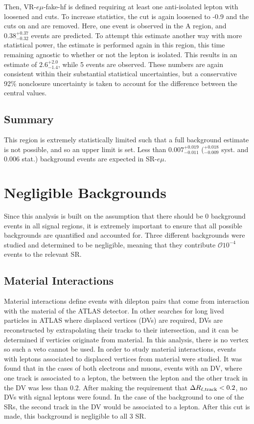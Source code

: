 Then, VR-$e\mu$-fake-hf is defined requiring at least one anti-isolated lepton with loosened \pt and \absdz cuts. To increase statistics, the \dpt cut is again loosened to -0.9 and the cuts on \nprecision and \nphi are removed. Here, one event is observed in the A region, and $0.38^{+0.37}_{-0.32}$ events are predicted. To attempt this estimate another way with more statistical power, the estimate is performed again in this region, this time remaining agnostic to whether or not the lepton is isolated. This results in an estimate of $2.6^{+2.0}_{-1.4}$, while 5 events are observed. These numbers are again consistent within their substantial statistical uncertainties, but a conservative 92\% nonclosure uncertainty is taken to account for the difference between the central values.

\subsection{Summary}
This region is extremely statistically limited such that a full background estimate is not possible, and so an upper limit is set. Less than 
$0.007^{+0.019}_{-0.011}$ ($^{+0.018}_{-0.009}$ syst. and 0.006 stat.) background events are expected in SR-$e\mu$.
 


\section{Negligible Backgrounds}
Since this analysis is built on the assumption that there should be 0 background events in all signal regions, it is extremely important to ensure that all possible backgrounds are quantified and accounted for. Three different backgrounds were studied and determined to be negligible, meaning that they contribute $\mathcal{O}10^{-4}$ events to the relevant \ac{SR}. 

\subsection{Material Interactions}

Material interactions define events with dilepton pairs that come from interaction with the material of the \ac{ATLAS} detector. In other searches for long lived particles in \ac{ATLAS} where displaced vertices (\acp{DV}) are required, \ac{DV}s are reconstructed by extrapolating their tracks to their intersection, and it can be determined if verticies originate from material. In this analysis, there is no vertex so such a veto cannot be used. In order to study material interactions, events with leptons associated to displaced vertices from material were studied. It was found that in the cases of both electrons and muons, events with an \ac{DV}, where one track is associated to a lepton, the \dR between the lepton and the other track in the \ac{DV} was less than 0.2. After making the requirement that $\Delta R_{\ell, \text{track}} < 0.2$, no \acp{DV} with signal leptons were found. In the case of the background to one of the \acp{SR}, the second track in the \ac{DV} would be associated to a lepton. After this cut is made, this background is negligible to all 3 \ac{SR}.

